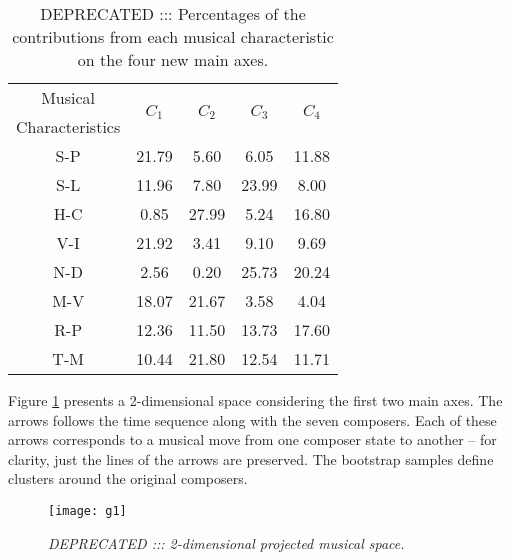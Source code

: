 \documentclass[
 aip,
 jmp,
 amsmath,amssymb,
 reprint,
]{revtex4-1}
\begin{document}
\begin{table}[ht]
\caption{\label{tab:Deviates}DEPRECATED ::: Percentages of
the contributions from each musical characteristic on the four
new main axes.}

\begin{tabular}{|c||c|c|c|c|}
\hline
Musical         & \multirow{2}{*}{$C_1$} & \multirow{2}{*}{$C_2$} & \multirow{2}{*}{$C_3$} & \multirow{2}{*}{$C_4$}\\
Characteristics & & & & \\
\hline
 S-P              &  21.79  &   5.60  &  6.05 & 11.88   \\
 S-L              &  11.96  &   7.80  & 23.99 &  8.00  \\
 H-C              &   0.85  &  27.99  &  5.24 & 16.80  \\
 V-I              &  21.92  &   3.41  &  9.10 &  9.69  \\
 N-D              &   2.56  &   0.20  & 25.73 & 20.24  \\
 M-V              &  18.07  &  21.67  &  3.58 &  4.04  \\
 R-P              &  12.36  &  11.50  & 13.73 & 17.60  \\
 T-M              &  10.44  &  21.80  & 12.54 & 11.71  \\
\hline
\end{tabular}
\end{table}

Figure \ref{fig:pca} presents a 2-dimensional space considering the
first two main axes. The arrows follows the time sequence along with the seven
composers. Each of these arrows corresponds to a musical move from one
composer state to another -- for clarity, just the lines of the arrows
are preserved. The bootstrap
samples define clusters around the original
composers.

\begin{figure}[htbp]
  \begin{center}
    \texttt{[image: g1]}
  \end{center}
  \caption{\it DEPRECATED ::: 2-dimensional projected musical space.}
  \label{fig:pca}
\end{figure}
\end{document}
